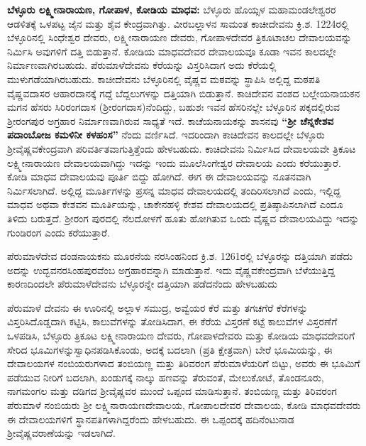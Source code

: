 \textbf{ಬೆಳ್ಳೂರು ಲಕ್ಷ್ಮೀನಾರಾಯಣ, ಗೋಪಾಳ, ಕೋಡಿಯ ಮಾಧವ:} ಬೆಳ್ಳೂರು ಹೊಯ್ಸಳ ಮಹಾಮಂಡಲೇಶ್ವರರ ಆಡಳಿತಕ್ಕೆ ಒಳಪಟ್ಟ ಜೈನ ಮತ್ತು ಶೈವ ಕೇಂದ್ರವಾಗಿತ್ತು. ವೀರಬಲ್ಲಾಳನ ಸಾಮಂತ ಕಾಚೀದೇವನು ಕ್ರಿ.ಶ. 1224ರಲ್ಲಿ ಬೆಳ್ಳೂರಿನಲ್ಲಿ ಸಿಂಧೇಶ್ವರ ದೇವರು, ಲಕ್ಷ್ಮೀನಾರಾಯಣ ದೇವರು, ಗೋಪಾಳದೇವರ ತ್ರಿಕೂಟಾಚಲ ದೇವಾಲಯವನ್ನು ನಿರ್ಮಿಸಿ ಅವುಗಳಿಗೆ ದತ್ತಿ ಬಿಡುತ್ತಾನೆ. ಕೋಡಿಯ ಮಾಧವದೇವರ ದೇವಾಲಯವೂ ಕೂಡಾ ಇವನ ಕಾಲದಲ್ಲೇ ನಿರ್ಮಾಣವಾಗಿರಬಹುದು. ಪೆರುಮಾಳೆದೇವನು ಕೆರೆಯನ್ನು ವಿಸ್ತರಿಸಿದಾಗ ಅದು ಕೆರೆಯಲ್ಲಿ ಮುಳುಗಡೆಯಾಗಿರಬಹುದು. ಕಾಚೀದೇವನು ಬೆಳ್ಳೂರಿನಲ್ಲಿ ವೈಷ್ಣವ ಮಠವನ್ನು ಸ್ಥಾಪಿಸಿ ಅಲ್ಲಿದ್ದ ಮಠಪತಿ ವೈಷ್ಣವದಾಸರ ಆಹಾರದಾನಕ್ಕೆ ಗದ್ದೆ ಬೆದ್ದಲುಗಳನ್ನು ದತ್ತಿಯಾಗಿ ಬಿಡುತ್ತಾನೆ. ಕಾಚಿದೇವನ ವಂಶದ ಬಲ್ಲೇಯನಾಯಕನ ಮಗನ ಹೆಸರು ಸಿರಿರಂಗದಾಸ (ಶ‍್ರೀರಂಗದಾಸ)ನೆಂದಿದ್ದು, ಬಹುಶಃ ಇವನ ಹೆಸರಿನಲ್ಲೇ ಬೆಳ್ಳೂರಿನ ಪಕ್ಕದಲ್ಲಿರುವ ಶ‍್ರೀರಂಗಪುರ ಅಗ್ರಹಾರ ನಿರ್ಮಾಣವಾಗಿರುವ ಸಾಧ್ಯತೆ ಇದೆ. ಕಾಚೆಯನಾಯಕನ್ನು ಶಾಸನವು \textbf{“ಶ‍್ರೀ ಚೆನ್ನಕೇಶವ ಪದಾಂಬೋಜ ಕಮಳಿನೀ ಕಳಹಂಸ” }ನೆಂದು ವರ್ಣಿಸಿದೆ. ಇದರಿಂದಾಗಿ ಕಾಚಿದೇವನ ಕಾಲದಲ್ಲೇ ಬೆಳ್ಳೂರು ಶ‍್ರೀವೈಷ್ಣವಕೇಂದ್ರವಾಗಿ ಪರಿವರ್ತಿತವಾಗುತ್ತಿತ್ತೆಂದು ಹೇಳಬಹುದು. ಕಾಚಿದೇವನು ನಿರ್ಮಿಸಿದ ದೇವಾಲಯವೇ ತ್ರಿಕೂಟ ಲಕ್ಷ್ಮೀನಾರಾಯಣ ದೇವಾಲಯವಾಗಿದ್ದು ಇದನ್ನು ಇಂದು ಮೂಲೆಸಿಂಗೇಶ್ವರ ದೇವಾಲಯ ಎಂದು ಕರೆಯುತ್ತಾರೆ. ಕೋಡಿ ಮಾಧವ ದೇವಾಲಯವು ಪೂರ್ತಿ ಬಿದ್ದು ಹೋಗಿದೆ. ಈಗ ಈ ದೇವಾಲಯವನ್ನು ನೂತನವಾಗಿ ನಿರ್ಮಿಸಲಾಗಿದೆ. ಅಲ್ಲಿದ್ದ ಮೂರ್ತಿಗಳನ್ನು ಪ್ರಸನ್ನ ಮಾಧವ ದೇವಾಲಯದಲ್ಲಿ ತಂದಿರಿಸಲಾಗಿದೆ ಎಂದು, ಇಲ್ಲಿದ್ದ ಮಾಧವ ಅಥವಾ ಕೇಶವನ ಮೂರ್ತಿಯನ್ನು, ಚಾಕೇನಹಳ್ಳಿ ಕೇಶವ ದೇವಾಲಯದಲ್ಲಿ ಪ್ರತಿಷ್ಠಾಪಿಸಲಾಗಿದೆ ಎಂದೂ ತಿಳಿದು ಬರುತ್ತದೆ. ಶ‍್ರೀರಂಗ ಪುರದಲ್ಲಿ ನೆಲದೋಳಗೆ ಹೂತು ಹೋಗಿತುವ ಒಂದು ವೈಷ್ಣವ ದೇವಾಲಯವಿದ್ದು ಇದನ್ನು ಗುಂಡಿರಂಗ ಎಂದು ಕರೆಯುತ್ತಾರೆ.

ಪೆರುಮಾಳೆದೇವ ದಂಡನಾಯಕನು ಮೂರನೆಯ ನರಸಿಂಹನಿಂದ ಕ್ರಿ.ಶ. 1261ರಲ್ಲಿ ಬೆಳ್ಳೂರನ್ನು ದತ್ತಿಯಾಗಿ ಪಡೆದು ಅದನ್ನು ಉದ್ಭವನರಸಿಂಹಪುರವೆಂಬ ಅಗ್ರಹಾರವನ್ನಾಗಿ ಮಾಡುತ್ತಾನೆ. ಇದು ವೈಷ್ಣವಕೇಂದ್ರವಾಗಿ ಬೆಳೆಯುತ್ತಿದ್ದ ಕಾರಣದಿಂದಲೇ ಪೆರುಮಾಳೆದೇವನು ಬೆಳ್ಳೂರನ್ನೇ ದತ್ತಿಯಾಗಿ ಪಡೆದನೆಂದು ಹೇಳಬಹುದು

ಪೆರುಮಾಳೆ ದೇವನು ಈ ಊರಿನಲ್ಲಿ ಅಲ್ಲಾಳ ಸಮುದ್ರ, ಅವ್ವೆಯರ ಕೆರೆ ಮತ್ತು ತಗಚಗೆರೆ ಕೆರೆಗಳನ್ನು ವಿಸ್ತರಿಸಿ\break ದೊಡ್ಡದಾಗಿ ಕಟ್ಟಿಸಿ, ಕಾಲುವೆಗಳನ್ನು ತೋಡಿಸಿದಾಗ, ಈ ಕೆರೆಯ ವಿಸ್ತರಣೆ ಕಟ್ಟೆ ಕಾಲುವೆಗಳ ವಿಸ್ತರಣೆಗೆ ಒಳಪಡಿಸಿ, ಬೆಳ್ಳೂರು ತ್ರಿಕೂಟ ಲಕ್ಷ್ಮೀನಾರಾಯಣ ದೇವರು, ಗೋಪಾಳದೇವರು ಮತ್ತು ಕೋಡಿಯ ಮಾಧವದೇವರಿಗೆ ಸೇರಿದ ಭೂಮಿಗಳನ್ನು\break ಸ್ವಾಧಿನಪಡಿಸಿಕೊಂಡು, ಅದಕ್ಕೆ ಬದಲಾಗಿ (ಪ್ರತಿ ಕ್ಷೇತ್ರವಾಗಿ) ಬೇರೆ ಭೂಮಿಯನ್ನು, ಈ ದೇವಾಲಯಗಳ ನಂಬಿಯರುಗಳಾದ ತಂಬಿಯಣ್ಣ ಮತ್ತು ತಿರಿವರಂಗ ಪೆರುಮಾಳೆಯರಿಗೆ ಬಿಟ್ಟು, ಅವರು ಈ ಭೂಮಿಗೆ ಪಡೆಯುವ ನೀರಿಗೆ ಬದಲಾಗಿ, ಖಂಡುಗಕ್ಕೆ ನಾಲ್ಕು ಹಣವನ್ನು ತೆರುವಂತೆ, ಮೇಲುಕೋಟೆ, ತೊಂಡನೂರು, ನಾಗಮಂಗಲ ಮತ್ತು ದಡಿಗದ ಶ‍್ರೀವೈಷ್ಣವರ ಮುಂದೆ ಒಪ್ಪಂದ ಮಾಡಿಸುತ್ತಾನೆ. ತಂಬಿಯಣ್ಣ ಮತ್ತು ತಿರಿವರಂಗ ಪೆರುಮಾಳೆ ನಂಬಿಯರು ಶ‍್ರೀ ಲಕ್ಷ್ಮಿನಾರಾಯಣದೇವಾಲಯ, ಗೋಪಾಲದೇವರ ದೇವಾಲಯ, ಕೋಡಿ ಮಾಧವದೇವರು ಈ ದೇವಾಲಯಗಳಿಗೆ ಸ್ಥಾನಪತಿಗಳಾಗಿದ್ದರೆಂದು ಹೇಳಬಹುದು. ಈ ಒಪ್ಪಂದಕ್ಕೆ ಹದಿನೆಂಟುನಾಡ ಶ‍್ರೀವೈಷ್ಣವರಾಣೆಯನ್ನು ಇಡಲಾಗಿದೆ.

